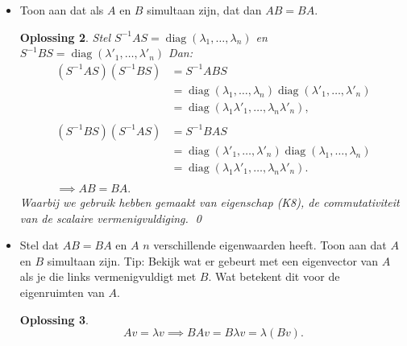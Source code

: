 \documentclass[a4paper,12pt]{article}
\newtheorem{oplossing}{Oplossing}
\begin{document}
\begin{enumerate}
\begin{itemize}
\begin{oplossing}
        Hier is 
        \(
        AB = \begin{pmatrix}
            0 & 0 \\
            1 & 0
        \end{pmatrix}
        \)
        en
        \(
        BA = \begin{pmatrix}
            -1 & 1 \\
            -1 & 1
        \end{pmatrix}
        \)

        Dus \(AB \neq BA\).
    \end{oplossing}
    \item[(ii)] Toon aan dat als $A$ en $B$ simultaan zijn, dat dan $AB = BA$.
    \begin{oplossing}
        Stel \(S^{-1} A S = \operatorname{diag}(\lambda_1,\dots,\lambda_n)\) en \(S^{-1} B S = \operatorname{diag}(\lambda'_1,\dots,\lambda'_n)\) 
        Dan:
        \begin{align*}
            (S^{-1} A S)(S^{-1} B S) 
            &= S^{-1} AB S\\
            &=  \operatorname{diag}(\lambda_1,\dots,\lambda_n)  \operatorname{diag}(\lambda'_1,\dots,\lambda'_n)\\
            &= \operatorname{diag}(\lambda_1\lambda'_1,\dots,\lambda_n\lambda'_n),\\
            \\
            (S^{-1} B S)(S^{-1} A S) 
            &= S^{-1} BA S\\
            &=  \operatorname{diag}(\lambda'_1,\dots,\lambda'_n)  \operatorname{diag}(\lambda_1,\dots,\lambda_n)\\
            &= \operatorname{diag}(\lambda_1\lambda'_1,\dots,\lambda_n\lambda'_n). \\
            \\
            \implies AB=BA.
        \end{align*}
        Waarbij we gebruik hebben gemaakt van eigenschap (K8), de commutativiteit van de scalaire vermenigvuldiging. \qed
    \end{oplossing}
    \item[(iii)] Stel dat $AB = BA$ en $A$ $n$ verschillende eigenwaarden heeft. Toon aan dat $A$ en $B$ simultaan zijn. Tip: Bekijk wat er gebeurt met een eigenvector van $A$ als je die links vermenigvuldigt met $B$. Wat betekent dit voor de eigenruimten van $A$.
     \begin{oplossing}
        \[A v = \lambda v \implies BAv = B\lambda v = \lambda (Bv). \]

\end{oplossing}
\end{itemize}
\end{enumerate}
\end{document}
